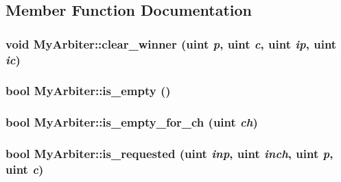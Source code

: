 \subsection{Member Function Documentation}
\hypertarget{classMyArbiter_871cdb7c56ea8d1d28f05baea1e985b1}{
\subsubsection[{clear\_\-winner}]{\setlength{\rightskip}{0pt plus 5cm}void MyArbiter::clear\_\-winner ({\bf uint} {\em p}, \/  {\bf uint} {\em c}, \/  {\bf uint} {\em ip}, \/  {\bf uint} {\em ic})}}
\label{classMyArbiter_871cdb7c56ea8d1d28f05baea1e985b1}


\hypertarget{classMyArbiter_26d587edddcee3e79772109317124927}{
\subsubsection[{is\_\-empty}]{\setlength{\rightskip}{0pt plus 5cm}bool MyArbiter::is\_\-empty ()}}
\label{classMyArbiter_26d587edddcee3e79772109317124927}


\hypertarget{classMyArbiter_5c29ed3eee201fbb92f61e6debc1ba91}{
\subsubsection[{is\_\-empty\_\-for\_\-ch}]{\setlength{\rightskip}{0pt plus 5cm}bool MyArbiter::is\_\-empty\_\-for\_\-ch ({\bf uint} {\em ch})}}
\label{classMyArbiter_5c29ed3eee201fbb92f61e6debc1ba91}


\hypertarget{classMyArbiter_4fe8d6a9091e160c2c500bceb455ba71}{
\subsubsection[{is\_\-requested}]{\setlength{\rightskip}{0pt plus 5cm}bool MyArbiter::is\_\-requested ({\bf uint} {\em inp}, \/  {\bf uint} {\em inch}, \/  {\bf uint} {\em p}, \/  {\bf uint} {\em c})}}
\label{classMyArbiter_4fe8d6a9091e160c2c500bceb455ba71}



